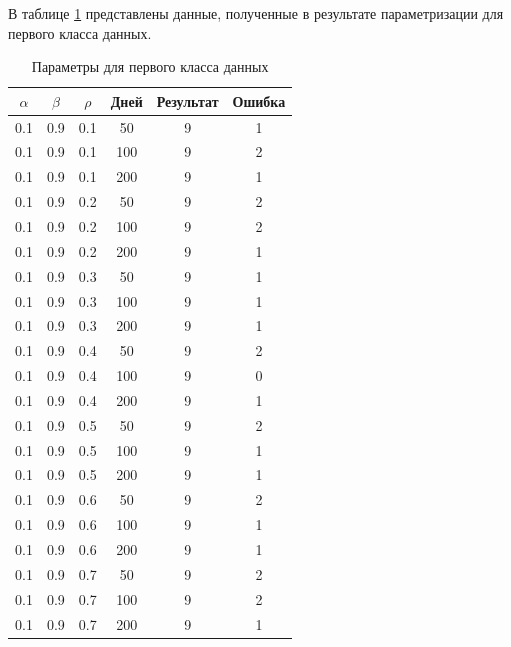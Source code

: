 \documentclass[a4paper,14pt, unknownkeysallowed]{extreport}
\begin{document}
В таблице \ref{tbl:table_kd1} представлены данные, полученные в результате параметризации для первого класса данных.

\begin{center}
\captionsetup{justification=raggedright,singlelinecheck=off}
\begin{longtable}[c]{|c|c|c|c|c|c|}
\caption{Параметры для первого класса данных \label{tbl:table_kd1}}
		\\ \hline
		$\alpha$ & $\beta$ & $\rho$ & Дней & Результат & Ошибка 
		\\ \hline

         0.1 &  0.9 &  0.1 &   50 &     9 &     1 \\
         0.1 &  0.9 &  0.1 &  100 &     9 &     2 \\
         0.1 &  0.9 &  0.1 &  200 &     9 &     1 \\
        \hline
         0.1 &  0.9 &  0.2 &   50 &     9 &     2 \\
         0.1 &  0.9 &  0.2 &  100 &     9 &     2 \\
         0.1 &  0.9 &  0.2 &  200 &     9 &     1 \\
        \hline
         0.1 &  0.9 &  0.3 &   50 &     9 &     1 \\
         0.1 &  0.9 &  0.3 &  100 &     9 &     1 \\
         0.1 &  0.9 &  0.3 &  200 &     9 &     1 \\
        \hline
         0.1 &  0.9 &  0.4 &   50 &     9 &     2 \\
         0.1 &  0.9 &  0.4 &  100 &     9 &     0 \\
         0.1 &  0.9 &  0.4 &  200 &     9 &     1 \\
        \hline
         0.1 &  0.9 &  0.5 &   50 &     9 &     2 \\
         0.1 &  0.9 &  0.5 &  100 &     9 &     1 \\
         0.1 &  0.9 &  0.5 &  200 &     9 &     1 \\
        \hline
         0.1 &  0.9 &  0.6 &   50 &     9 &     2 \\
         0.1 &  0.9 &  0.6 &  100 &     9 &     1 \\
         0.1 &  0.9 &  0.6 &  200 &     9 &     1 \\
        \hline
         0.1 &  0.9 &  0.7 &   50 &     9 &     2 \\
         0.1 &  0.9 &  0.7 &  100 &     9 &     2 \\
         0.1 &  0.9 &  0.7 &  200 &     9 &     1 \\

\end{longtable}
\end{center}
\end{document}
